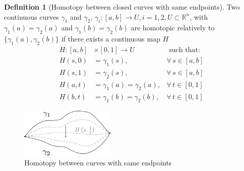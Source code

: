 \documentclass[a4paper,11pt,titlepage, article, oneside]{memoir}
\numberwithin{equation}{section}
\theoremstyle{definition}
\newtheorem{definition}[theorem]{Definition}
\theoremstyle{remark}
\newcommand{\rfield}{\mathbb{R}}
\begin{document}
\begin{definition}[Homotopy between closed curves with same endpoints]
  Two continuous curves $\gamma_1$ and $\gamma_2$, $\gamma_i \colon [a, b] \rightarrow U, i=1,2, U \subset \rfield^n$, with $\gamma_1(a) = \gamma_2(a)$ and $\gamma_1(b) = \gamma_2(b)$ are homotopic relatively to $\{\gamma_1(a), \gamma_2(b)\}$ if there exists a continuous map $H$
  \begin{align*}
    H \colon [a, b] &\times [0, 1] \rightarrow U &\text{ such that:}\\
    H(s, 0) &= \gamma_1(s), &\forall\, s \in [a, b] \\
    H(s, 1) &= \gamma_2(s), &\forall\, s \in [a, b] \\
    H(a, t) &= \gamma_1(a) = \gamma_2(a), &\forall\, t \in [0, 1] \\
    H(b, t) &= \gamma_1(b) = \gamma_2(b), &\forall\, t \in [0, 1]
  \end{align*}
  \begin{figure}[h] \label{Fig:hom2}
     \centering
     \includegraphics[width=0.4\textwidth]{Images/homotopy2.pdf} 
     \caption{Homotopy between curves with same endpoints}      
\end{figure}
\end{definition}
\end{document}
